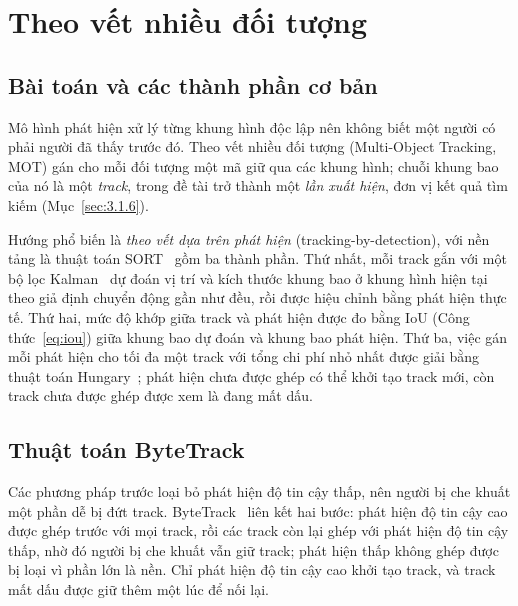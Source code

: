 \section{Theo vết nhiều đối tượng}
\label{sec:3.3}

\subsection{Bài toán và các thành phần cơ bản}
\label{sec:3.3.1}
\label{sec:3.3.2}

Mô hình phát hiện xử lý từng khung hình độc lập nên không biết một người có phải người đã thấy trước đó. Theo vết nhiều đối tượng (Multi-Object Tracking, MOT) gán cho mỗi đối tượng một mã giữ qua các khung hình; chuỗi khung bao của nó là một \emph{track}, trong đề tài trở thành một \emph{lần xuất hiện}, đơn vị kết quả tìm kiếm (Mục~\ref{sec:3.1.6}).

Hướng phổ biến là \emph{theo vết dựa trên phát hiện} (tracking-by-detection), với nền tảng là thuật toán SORT~\cite{bewley2016sort} gồm ba thành phần. Thứ nhất, mỗi track gắn với một bộ lọc Kalman~\cite{kalman1960} dự đoán vị trí và kích thước khung bao ở khung hình hiện tại theo giả định chuyển động gần như đều, rồi được hiệu chỉnh bằng phát hiện thực tế. Thứ hai, mức độ khớp giữa track và phát hiện được đo bằng IoU (Công thức~\ref{eq:iou}) giữa khung bao dự đoán và khung bao phát hiện. Thứ ba, việc gán mỗi phát hiện cho tối đa một track với tổng chi phí nhỏ nhất được giải bằng thuật toán Hungary~\cite{kuhn1955hungarian}; phát hiện chưa được ghép có thể khởi tạo track mới, còn track chưa được ghép được xem là đang mất dấu.

\subsection{Thuật toán ByteTrack}
\label{sec:3.3.3}

Các phương pháp trước loại bỏ phát hiện độ tin cậy thấp, nên người bị che khuất một phần dễ bị đứt track. ByteTrack~\cite{zhang2022bytetrack} liên kết hai bước: phát hiện độ tin cậy cao được ghép trước với mọi track, rồi các track còn lại ghép với phát hiện độ tin cậy thấp, nhờ đó người bị che khuất vẫn giữ track; phát hiện thấp không ghép được bị loại vì phần lớn là nền. Chỉ phát hiện độ tin cậy cao khởi tạo track, và track mất dấu được giữ thêm một lúc để nối lại.

